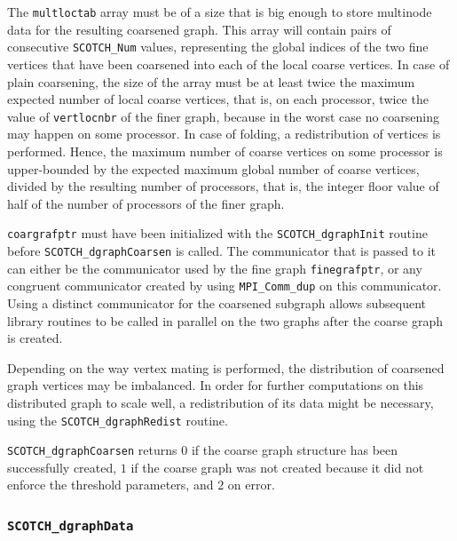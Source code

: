 \begin{itemize}
The {\tt multloctab} array must be of a size that is big enough to
store multinode data for the resulting coarsened graph. This array
will contain pairs of consecutive {\tt SCOTCH\_\lbt Num} values,
representing the global indices of the two fine vertices that have
been coarsened into each of the local coarse vertices. In case of
plain coarsening, the size of the array must be at least twice the
maximum expected number of local coarse vertices, that is, on each
processor, twice the value of {\tt vert\lbt loc\lbt nbr} of the finer
graph, because in the worst case no coarsening may happen on some
processor. In case of folding, a redistribution of vertices is
performed. Hence, the maximum number of coarse vertices on some
processor is upper-bounded by the expected maximum global number of
coarse vertices, divided by the resulting number of processors, that
is, the integer floor value of half of the number of processors of the
finer graph.

{\tt coargrafptr} must have been initialized with the
{\tt SCOTCH\_\lbt dgraph\lbt Init} routine before
{\tt SCOTCH\_dgraph\lbt Coarsen} is called. The communicator that is
passed to it can either be the communicator used by the fine graph
{\tt fine\lbt graf\lbt ptr}, or any congruent communicator created by
using {\tt MPI\_\lbt Comm\_\lbt dup} on this communicator. Using a
distinct communicator for the coarsened subgraph allows subsequent
library routines to be called in parallel on the two graphs after the
coarse graph is created.

Depending on the way vertex mating is performed, the distribution of
coarsened graph vertices may be imbalanced. In order for further
computations on this distributed graph to scale well, a redistribution
of its data might be necessary, using the
{\tt SCOTCH\_dgraph\lbt Redist} routine.

\progret

{\tt SCOTCH\_dgraphCoarsen} returns $0$ if the coarse graph
structure has been successfully created, $1$ if the coarse graph was
not created because it did not enforce the threshold parameters, and
$2$ on error.
\end{itemize}

\subsubsection{{\tt SCOTCH\_dgraphData}}
\label{sec-lib-func-scotchdgraphdata}

